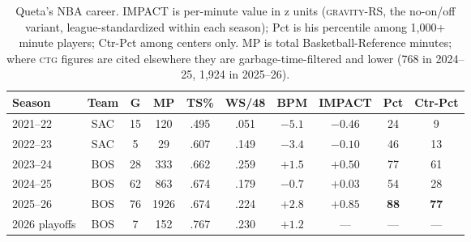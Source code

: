 \documentclass[11pt]{article}
\newcommand{\gravity}{\textsc{gravity}}
\newcommand{\ctg}{\textsc{ctg}}
\begin{document}
\begin{table}[h]
\centering\small
\caption{Queta's NBA career. IMPACT is per-minute value in z units (\gravity-RS, the
no-on/off variant, league-standardized within each season); Pct is his percentile among
1{,}000+ minute players; Ctr-Pct among centers only. MP is total Basketball-Reference
minutes; where \ctg{} figures are cited elsewhere they are garbage-time-filtered and
lower (768 in 2024--25, 1{,}924 in 2025--26).}
\begin{tabular}{lccccccccc}
\toprule
Season & Team & G & MP & TS\% & WS/48 & BPM & IMPACT & Pct & Ctr-Pct \\
\midrule
2021--22 & SAC & 15 & 120 & .495 & .051 & $-5.1$ & $-0.46$ & 24 & 9 \\
2022--23 & SAC & 5 & 29 & .607 & .149 & $-3.4$ & $-0.10$ & 46 & 13 \\
2023--24 & BOS & 28 & 333 & .662 & .259 & $+1.5$ & $+0.50$ & 77 & 61 \\
2024--25 & BOS & 62 & 863 & .674 & .179 & $-0.7$ & $+0.03$ & 54 & 28 \\
2025--26 & BOS & 76 & 1926 & .674 & .224 & $+2.8$ & $\mathbf{+0.85}$ & \textbf{88} & \textbf{77} \\
\midrule
2026 playoffs & BOS & 7 & 152 & .767 & .230 & $+1.2$ & --- & --- & --- \\
\bottomrule
\end{tabular}
\label{tab:career}
\end{table}
\end{document}
